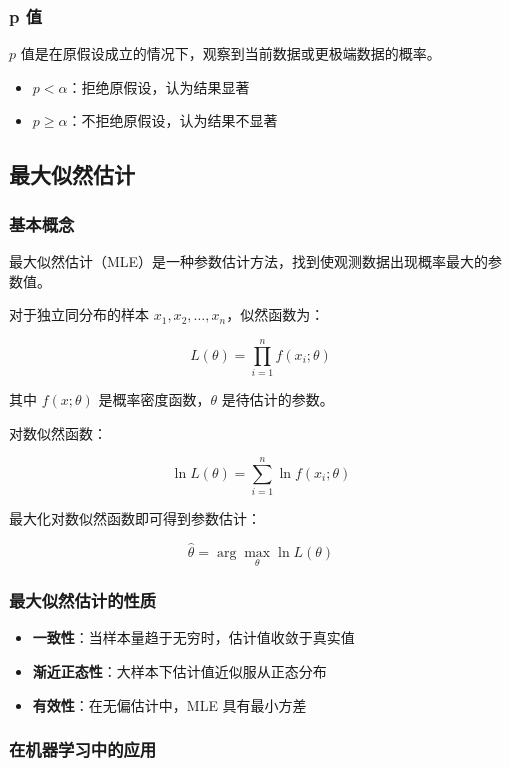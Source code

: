 \documentclass[12pt,UTF8]{ctexbook}
\begin{document}
\subsubsection{p 值}

$p$ 值是在原假设成立的情况下，观察到当前数据或更极端数据的概率。

\begin{itemize}[leftmargin=2cm]
    \item $p < \alpha$：拒绝原假设，认为结果显著
    \item $p \geq \alpha$：不拒绝原假设，认为结果不显著
\end{itemize}

\subsection{最大似然估计}

\subsubsection{基本概念}

最大似然估计（MLE）是一种参数估计方法，找到使观测数据出现概率最大的参数值。

对于独立同分布的样本 $x_1, x_2, \dots, x_n$，似然函数为：

$$L(\theta) = \prod_{i=1}^{n} f(x_i; \theta)$$

其中 $f(x; \theta)$ 是概率密度函数，$\theta$ 是待估计的参数。

对数似然函数：

$$\ln L(\theta) = \sum_{i=1}^{n} \ln f(x_i; \theta)$$

最大化对数似然函数即可得到参数估计：

$$\hat{\theta} = \arg\max_{\theta} \ln L(\theta)$$

\subsubsection{最大似然估计的性质}

\begin{itemize}[leftmargin=2cm]
    \item \textbf{一致性}：当样本量趋于无穷时，估计值收敛于真实值
    \item \textbf{渐近正态性}：大样本下估计值近似服从正态分布
    \item \textbf{有效性}：在无偏估计中，MLE 具有最小方差
\end{itemize}

\subsubsection{在机器学习中的应用}
\end{document}
